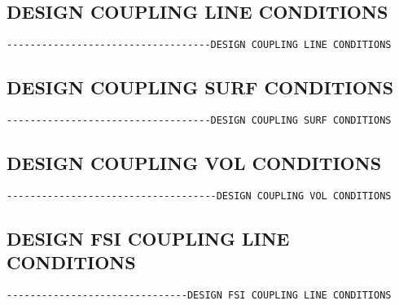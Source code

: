 \subsection{DESIGN COUPLING LINE CONDITIONS}
\begin{verbatim}
-----------------------------------DESIGN COUPLING LINE CONDITIONS
\end{verbatim}



\subsection{DESIGN COUPLING SURF CONDITIONS}
\begin{verbatim}
-----------------------------------DESIGN COUPLING SURF CONDITIONS
\end{verbatim}



\subsection{DESIGN COUPLING VOL CONDITIONS}
\begin{verbatim}
------------------------------------DESIGN COUPLING VOL CONDITIONS
\end{verbatim}



\subsection{DESIGN FSI COUPLING LINE CONDITIONS}
\begin{verbatim}
-------------------------------DESIGN FSI COUPLING LINE CONDITIONS
\end{verbatim}


